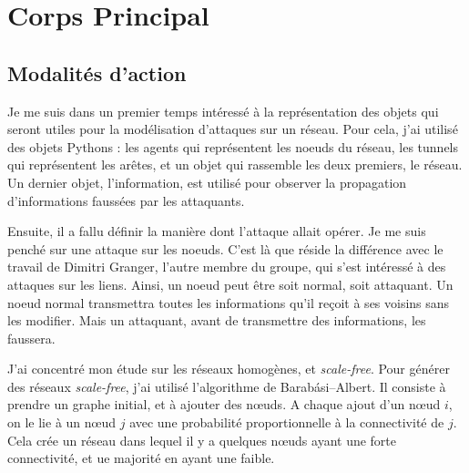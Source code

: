 \documentclass[11pt,a4paper]{article}
\begin{document}
\section{Corps Principal} %

\subsection{Modalités d'action}


Je me suis dans un premier temps intéressé à la représentation des objets qui seront utiles pour la modélisation d'attaques sur un réseau.  Pour cela, j'ai utilisé des objets Pythons : les agents qui représentent les noeuds du réseau, les tunnels qui représentent les arêtes, et un objet qui rassemble les deux premiers, le réseau. Un dernier objet, l'information, est utilisé pour observer la propagation d'informations faussées par les attaquants.

Ensuite, il a fallu définir la manière dont l'attaque allait opérer. Je me suis penché sur une attaque sur les noeuds. C'est là que réside la différence avec le travail de Dimitri Granger, l'autre membre du groupe, qui s'est intéressé à des attaques sur les liens. Ainsi, un noeud peut être soit normal, soit attaquant. Un noeud normal transmettra toutes les informations qu'il reçoit à ses voisins sans les modifier. Mais un attaquant, avant de transmettre des informations, les faussera. 
	
\begin{center}
\end{center} 

	J'ai concentré mon étude sur les réseaux homogènes, et \emph{scale-free}. Pour générer des réseaux \emph{scale-free}, j'ai utilisé l'algorithme de Barabási–Albert. Il consiste à prendre un graphe initial, et à ajouter des nœuds. A chaque ajout d'un nœud $i$, on le lie à un nœud $j$ avec une probabilité proportionnelle à la connectivité de $j$. Cela crée un réseau dans lequel il y a quelques nœuds ayant une forte connectivité, et ue majorité en ayant une faible.
	
\end{document}
